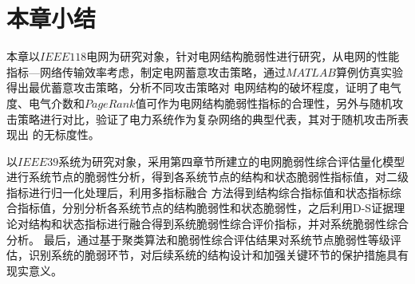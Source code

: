 \section{本章小结}
\label{sec:sum5}
本章以$IEEE118$电网为研究对象，针对电网结构脆弱性进行研究，从电网的性能指标—网络传输效率考虑，制定电网蓄意攻击策略，通过$MATLAB$算例仿真实验得出最优蓄意攻击策略，分析不同攻击策略对
电网结构的破坏程度，证明了电气度、电气介数和$PageRank$值可作为电网结构脆弱性指标的合理性，另外与随机攻击策略进行对比，验证了电力系统作为复杂网络的典型代表，其对于随机攻击所表现出
的无标度性。

以$IEEE39$系统为研究对象，采用第四章节所建立的电网脆弱性综合评估量化模型进行系统节点的脆弱性分析，得到各系统节点的结构和状态脆弱性指标值，对二级指标进行归一化处理后，利用多指标融合
方法得到结构综合指标值和状态指标综合指标值，分别分析各系统节点的结构脆弱性和状态脆弱性，之后利用D-S证据理论对结构和状态指标进行融合得到系统脆弱性综合评价指标，并对系统脆弱性综合分析。
最后，通过基于聚类算法和脆弱性综合评估结果对系统节点脆弱性等级评估，识别系统的脆弱环节，对后续系统的结构设计和加强关键环节的保护措施具有现实意义。

